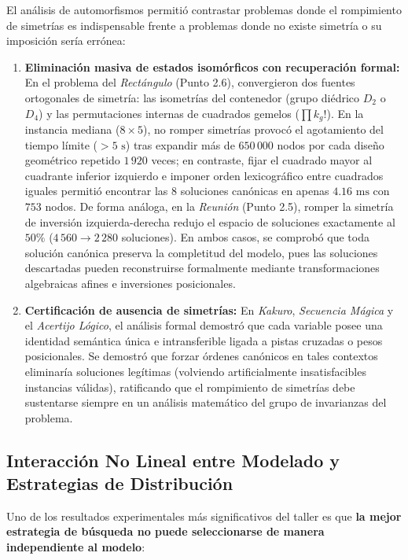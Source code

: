 El análisis de automorfismos permitió contrastar problemas donde el rompimiento de simetrías es indispensable frente a problemas donde no existe simetría o su imposición sería errónea:

\begin{enumerate}
    \item \textbf{Eliminación masiva de estados isomórficos con recuperación formal:}
    En el problema del \textit{Rectángulo} (Punto 2.6), convergieron dos fuentes ortogonales de simetría: las isometrías del contenedor (grupo diédrico $D_2$ o $D_4$) y las permutaciones internas de cuadrados gemelos ($\prod k_g!$). En la instancia mediana ($8\times 5$), no romper simetrías provocó el agotamiento del tiempo límite ($>5\text{ s}$) tras expandir más de $650\,000$ nodos por cada diseño geométrico repetido $1\,920$ veces; en contraste, fijar el cuadrado mayor al cuadrante inferior izquierdo e imponer orden lexicográfico entre cuadrados iguales permitió encontrar las $8$ soluciones canónicas en apenas $4.16\text{ ms}$ con $753$ nodos. De forma análoga, en la \textit{Reunión} (Punto 2.5), romper la simetría de inversión izquierda-derecha redujo el espacio de soluciones exactamente al $50\%$ ($4\,560 \to 2\,280$ soluciones). En ambos casos, se comprobó que toda solución canónica preserva la completitud del modelo, pues las soluciones descartadas pueden reconstruirse formalmente mediante transformaciones algebraicas afines e inversiones posicionales.
    
    \item \textbf{Certificación de ausencia de simetrías:}
    En \textit{Kakuro}, \textit{Secuencia Mágica} y el \textit{Acertijo Lógico}, el análisis formal demostró que cada variable posee una identidad semántica única e intransferible ligada a pistas cruzadas o pesos posicionales. Se demostró que forzar órdenes canónicos en tales contextos eliminaría soluciones legítimas (volviendo artificialmente insatisfacibles instancias válidas), ratificando que el rompimiento de simetrías debe sustentarse siempre en un análisis matemático del grupo de invarianzas del problema.
\end{enumerate}

\subsection{Interacción No Lineal entre Modelado y Estrategias de Distribución}

Uno de los resultados experimentales más significativos del taller es que \textbf{la mejor estrategia de búsqueda no puede seleccionarse de manera independiente al modelo}:

